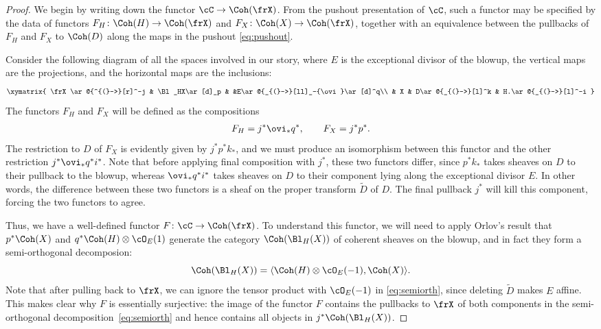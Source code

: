 \begin{proof}
We begin by writing down the functor $\cC\to \Coh(\frX)$. From the pushout presentation of $\cC$, such a functor may be specified by the data of functors $F_H\colon \Coh(H)\to \Coh(\frX)$ and $F_X\colon \Coh(X)\to\Coh(\frX)$, together with an equivalence between the pullbacks of $F_H$ and $F_X$ to $\Coh(D)$ along the maps in the pushout \eqref{eq:pushout}.

Consider the following diagram of all the spaces involved in our story, where $E$ is the exceptional divisor of the blowup, the vertical maps are the projections, and the horizontal maps are the inclusions:
\[
\xymatrix{
\frX\ar@{^{(}->}[r]^-j & \Bl_HX\ar[d]_p & &E\ar@{_{(}->}[ll]_-{\ovi}\ar[d]^q\\
& X & D\ar@{_{(}->}[l]^k & H.\ar@{_{(}->}[l]^-i
}
\]
The functors $F_H$ and $F_X$ will be defined as the compositions
\begin{gather*}
F_H = j^*\ovi_* q^*, \qquad F_X = j^*p^*.
\end{gather*}
The restriction to $D$ of $F_X$ is evidently given by $j^*p^*k_*$, and we must produce an isomorphism between this functor and the other restriction $j^*\ovi_*q^*i^*$. Note that before applying final composition with $j^*$, these two functors differ, since $p^*k_*$ takes sheaves on $D$ to their pullback to the blowup, whereas $\ovi_* q^*i^*$ takes sheaves on $D$ to their component lying along the exceptional divisor $E$. In other words, the difference between these two functors is a sheaf on the proper transform $\widetilde{D}$ of $D$. The final pullback $j^*$ will kill this component, forcing the two functors to agree.

Thus, we have a well-defined functor $F\colon\cC\to \Coh(\frX)$.
To understand this functor,
we will need to apply
Orlov's result \cite{Orl92} that $p^*\Coh(X)$ and $q^*\Coh(H)\otimes\cO_E(1)$ generate the category $\Coh(\Bl_H(X))$ of coherent sheaves on the blowup, and in fact they form a semi-orthogonal decomposion:
\begin{equation}\label{eq:semiorth}
\Coh(\Bl_H(X)) = \langle \Coh(H)\otimes \cO_E(-1), \Coh(X)\rangle.
\end{equation}
Note that after pulling back to $\frX$, we can ignore the tensor
product with $\cO_E(-1)$ in \eqref{eq:semiorth}, since deleting $\widetilde{D}$ makes $E$ affine. This makes clear why $F$ is essentially surjective: the image of the functor $F$ contains the pullbacks to $\frX$ of both components in the semi-orthogonal decomposition~\eqref{eq:semiorth} and hence contains all objects in $j^*\Coh(\Bl_H(X))$.


\end{proof}
